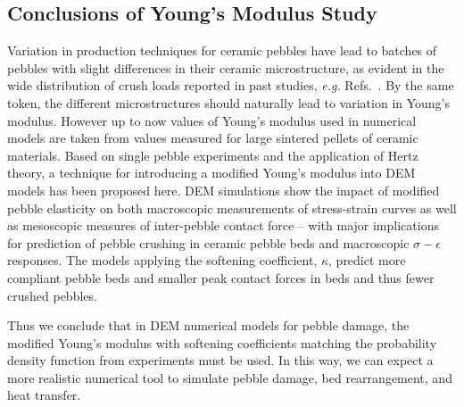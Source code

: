 \subsection{Conclusions of Young's Modulus Study}
Variation in production techniques for ceramic pebbles have lead to batches of pebbles with slight differences in their ceramic microstructure, as evident in the wide distribution of crush loads reported in past studies, \textit{e.g.} Refs.~\cite{Zhao2012,Mandal2012a}. By the same token, the different microstructures should naturally lead to variation in Young’s modulus. However up to now values of Young’s modulus used in numerical models are taken from values measured for large sintered pellets of ceramic materials. Based on single pebble experiments and the application of Hertz theory, a technique for introducing a modified Young’s modulus into DEM models has been proposed here. DEM simulations show the impact of modified pebble elasticity on both macroscopic measurements of stress-strain curves as well as mesoscopic measures of inter-pebble contact force -- with major implications for prediction of pebble crushing in ceramic pebble beds and macroscopic $\sigma-\epsilon$ responses. The models applying the softening coefficient, $\kappa$, predict more compliant pebble beds and smaller peak contact forces in beds and thus fewer crushed pebbles.

Thus we conclude that in DEM numerical models for pebble damage, the modified Young's modulus with softening coefficients matching the probability density function from experiments must be used. In this way, we can expect a more realistic numerical tool to simulate pebble damage, bed rearrangement, and heat transfer.